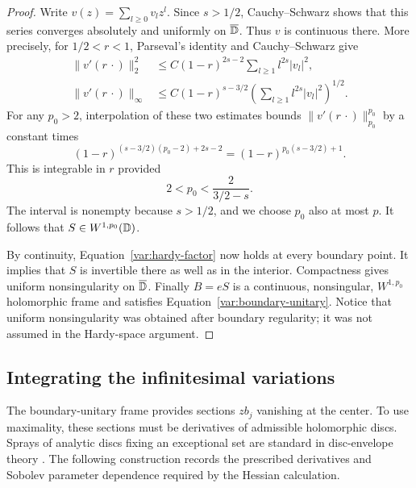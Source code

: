 \begin{proof}
Write $v(z)=\sum_{l\ge0}v_lz^l$.  Since $s>1/2$, Cauchy--Schwarz
shows that this series converges absolutely and uniformly on
$\overline{\mathbb D}$.  Thus $v$ is continuous there.  More precisely, for
$1/2<r<1$, Parseval's identity and Cauchy--Schwarz give
\begin{align}
 \|v'(r\,\cdot)\|_2^2
 &\le C(1-r)^{2s-2}
       \sum_{l\ge1}l^{2s}|v_l|^2,
       \label{var:factor-l2}\\
 \|v'(r\,\cdot)\|_\infty
 &\le C(1-r)^{s-3/2}
       \left(\sum_{l\ge1}l^{2s}|v_l|^2\right)^{1/2}.
       \label{var:factor-sup}
\end{align}
For any $p_0>2$, interpolation of these two estimates bounds
$\|v'(r\,\cdot)\|_{p_0}^{p_0}$ by a constant times
\[
 (1-r)^{(s-3/2)(p_0-2)+2s-2}
       =(1-r)^{p_0(s-3/2)+1}.
\]
This is integrable in $r$ provided
\begin{equation}\label{var:p0-choice}
 2<p_0<\frac{2}{3/2-s}.
\end{equation}
The interval is nonempty because $s>1/2$, and we choose $p_0$ also
at most $p$.  It follows that $S\in W^{1,p_0}(\mathbb D)$.

By continuity, Equation~\eqref{var:hardy-factor} now holds at every
boundary point.  It implies that $S$ is invertible there as well as
in the interior.  Compactness gives uniform nonsingularity on
$\overline{\mathbb D}$.  Finally $B=eS$ is a continuous, nonsingular,
$W^{1,p_0}$ holomorphic frame and satisfies
Equation~\eqref{var:boundary-unitary}.  Notice that uniform
nonsingularity was obtained after boundary regularity; it was not
assumed in the Hardy-space argument.
\end{proof}

\subsection{Integrating the infinitesimal variations}

The boundary-unitary frame provides sections $zb_j$ vanishing at the
center. To use maximality, these sections must be derivatives of
admissible holomorphic discs. Sprays of analytic discs fixing an
exceptional set are standard in disc-envelope theory
\cite[Definition~2.1 and Lemma~2.2]{DrinovecForstneric2012}.
The following construction records the prescribed derivatives and
Sobolev parameter dependence required by the Hessian calculation.

